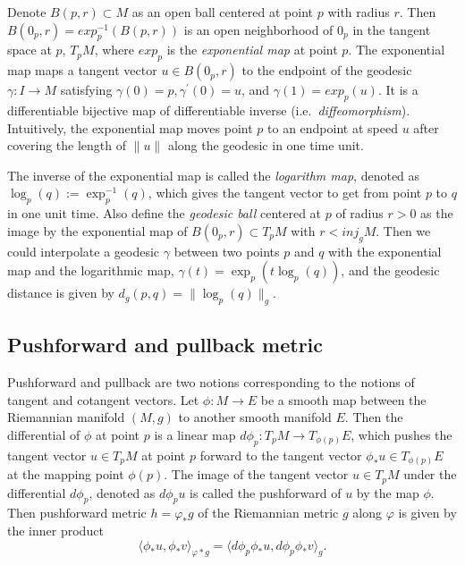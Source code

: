 \documentclass[12pt]{article}
\begin{document}
Denote \(B(p, r) \subset M\) as an open ball centered at point \(p\) with radius \(r\). Then \(B(0_p, r) = exp_p^{-1}(B(p,r))\) is an open neighborhood of \(0_p\) in the tangent space at \(p\), \(T_pM\), where \(exp_p\) is the \emph{exponential map} at point \(p\). The exponential map maps a tangent vector \(u \in B(0_p, r)\) to the endpoint of the geodesic \(\gamma: I \rightarrow M\) satisfying \(\gamma(0)=p, \gamma^{\prime}(0)=u\), and \(\gamma(1)=exp_p(u)\). It is a differentiable bijective map of differentiable inverse (i.e.~\emph{diffeomorphism}). Intuitively, the exponential map moves point \(p\) to an endpoint at speed \(u\) after covering the length of \(\|u\|\) along the geodesic in one time unit.

The inverse of the exponential map is called the \emph{logarithm map}, denoted as \(\log_p(q):= \exp^{-1}_p(q)\), which gives the tangent vector to get from point \(p\) to \(q\) in one unit time. Also define the \emph{geodesic ball} centered at \(p\) of radius \(r > 0\) as the image by the exponential map of \(B(0_p, r) \subset T_pM\) with \(r < \textit{inj}_gM\). Then we could interpolate a geodesic \(\gamma\) between two points \(p\) and \(q\) with the exponential map and the logarithmic map, \(\gamma(t) = \exp_p(t\log_p(q))\), and the geodesic distance is given by \(d_g(p,q) = \|\log_p(q)\|_g\).

\hypertarget{pushforward-and-pullback-metric}{%
\subsection{Pushforward and pullback metric}\label{pushforward-and-pullback-metric}}

Pushforward and pullback are two notions corresponding to the notions of tangent and cotangent vectors.
Let \(\phi: M \rightarrow E\) be a smooth map between the Riemannian manifold \((M,g)\) to another smooth manifold \(E\). Then the differential of \(\phi\) at point \(p\) is a linear map \(d\phi_p: T_pM \rightarrow T_{\phi (p)}E\), which pushes the tangent vector \(u \in T_pM\) at point \(p\) forward to the tangent vector \(\phi_*u \in T_{\phi (p)}E\) at the mapping point \(\phi(p)\).
The image of the tangent vector \(u \in T_pM\) under the differential \(d\phi_p\), denoted as \(d\phi_p u\) is called the pushforward of \(u\) by the map \(\phi\).
Then pushforward metric \(h=\varphi_*g\) of the Riemannian metric \(g\) along \(\varphi\) is given by the inner product
\[
\langle \phi_*u,\phi_*v \rangle_{\varphi*g} = \langle d\phi_p \phi_*u, d\phi_p \phi_*v \rangle_{g}.
\]
\end{document}
